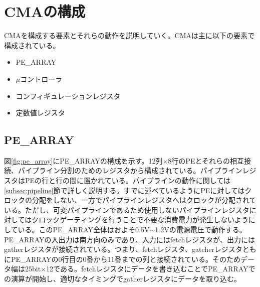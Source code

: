 {%





\section{CMAの構成}
\label{sec:about_cma}
CMAを構成する要素とそれらの動作を説明していく。CMAは主に以下の要素で構成されている。
\begin{itemize}
\item PE\_ARRAY    
\item $\mu$コントローラ
\item コンフィギュレーションレジスタ
\item 定数値レジスタ
\end{itemize}

\subsection{PE\_ARRAY}
\label{subsec:pe_array}
図\ref{fig:pe_array}にPE\_ARRAYの構成を示す。12列$\times$8行のPEとそれらの相互接続、パイプライン分割のためのレジスタから構成されている。パイプラインレジスタはPEの行と行の間に置かれている。パイプラインの動作に関しては\ref{subsec:pipeline}節で詳しく説明する。すでに述べているようにPEに対してはクロックの分配をしない、一方でパイプラインレジスタへはクロックが分配されている。ただし、可変パイプラインであるため使用しないパイプラインレジスタに対してはクロックゲーティングを行うことで不要な消費電力が発生しないようにしている。このPE\_ARRAY全体はおよそ0.5V$\sim$1.2Vの電源電圧で動作する。PE\_ARRAYの入出力は南方向のみであり、入力にはfetchレジスタが、出力にはgatherレジスタが接続されている。つまり、fetchレジスタ、gatcherレジスタともにPE\_ARRAYの0行目の0番から11番までの列と接続されている。そのためデータ幅は25bit$\times$12である。fetchレジスタにデータを書き込むことでPE\_ARRAYでの演算が開始し、適切なタイミングでgatherレジスタにデータを取り込む。\\

}
